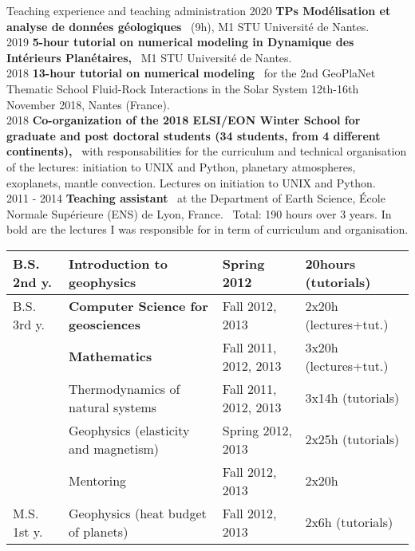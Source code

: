 \documentclass{cv}
\newcommand{\lieu}[1]{{#1}\ }
\newcommand{\activite}[1]{\textbf{#1}\ }
\begin{document}
\begin{rubrique}{Teaching experience and teaching administration}
	2020 \activite{TPs Mod\'elisation et analyse de donn\'ees g\'eologiques} (9h), M1 STU Universit\'e de Nantes.\\
	
	2019 \activite{5-hour tutorial on numerical modeling in Dynamique des Int\'erieurs Plan\'etaires,} M1 STU Universit\'e de Nantes.\\

	2018 \activite{13-hour tutorial on numerical modeling}
	for the 2nd GeoPlaNet Thematic School Fluid-Rock Interactions
	in the Solar System 12th-16th November 2018, Nantes (France).\\

	2018 \activite{Co-organization of the 2018 ELSI/EON Winter School for graduate and post doctoral students (34 students, from 4 different continents),} with responsabilities for the curriculum and technical organisation of the lectures: initiation to UNIX and Python, planetary atmospheres, exoplanets, mantle convection. Lectures on initiation to UNIX and Python.\\


2011 - 2014 
	\activite{Teaching assistant} \lieu{at the Department of Earth Science, \'Ecole Normale Sup\'erieure (ENS) de Lyon, France.} Total: 190 hours over 3 years.
	In bold are the lectures I was responsible for in term of curriculum and organisation.
	\vspace{0.5cm}

	\noindent
	\begin{tabular}{llll}
		\hline
		B.S. 2nd y. & Introduction to geophysics & Spring 2012 & 20hours (tutorials)\\
		\hline
		B.S. 3rd y.& \textbf{Computer Science for geosciences} & Fall 2012, 2013 & 2x20h (lectures+tut.)\\
		& \textbf{Mathematics} & Fall 2011, 2012, 2013 & 3x20h (lectures+tut.)\\
		& Thermodynamics of natural systems & Fall 2011, 2012, 2013 & 3x14h (tutorials)\\
		& Geophysics (elasticity and magnetism)& Spring 2012, 2013 & 2x25h (tutorials)\\
		& Mentoring & Fall 2012, 2013 & 2x20h\\
		\hline
		M.S. 1st y. & Geophysics (heat budget of planets) & Fall 2012, 2013 & 2x6h (tutorials)\\
		\hline
	\end{tabular}
\end{rubrique}
\end{document}
